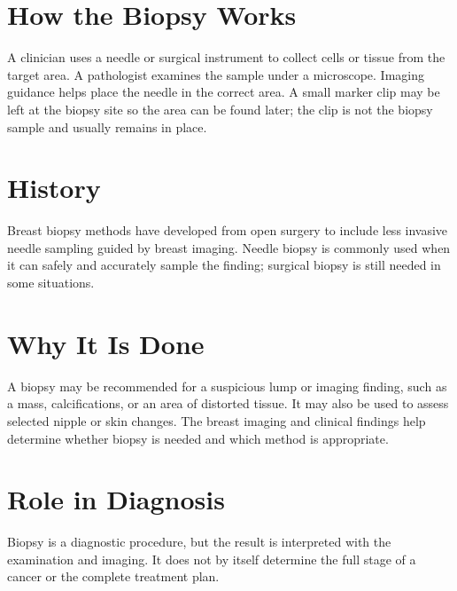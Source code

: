 \section*{How the Biopsy Works}
A clinician uses a needle or surgical instrument to collect cells or tissue from the target area. A pathologist examines the sample under a microscope. Imaging guidance helps place the needle in the correct area. A small marker clip may be left at the biopsy site so the area can be found later; the clip is not the biopsy sample and usually remains in place.

\section*{History}
Breast biopsy methods have developed from open surgery to include less invasive needle sampling guided by breast imaging. Needle biopsy is commonly used when it can safely and accurately sample the finding; surgical biopsy is still needed in some situations.

\section*{Why It Is Done}
A biopsy may be recommended for a suspicious lump or imaging finding, such as a mass, calcifications, or an area of distorted tissue. It may also be used to assess selected nipple or skin changes. The breast imaging and clinical findings help determine whether biopsy is needed and which method is appropriate.

\section*{Role in Diagnosis}
Biopsy is a diagnostic procedure, but the result is interpreted with the examination and imaging. It does not by itself determine the full stage of a cancer or the complete treatment plan.

